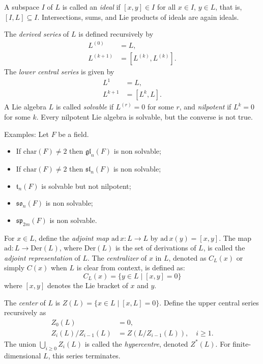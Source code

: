 \documentclass[11pt]{amsart}
\theoremstyle{plain}
\def\ad{\mathrm{ad}}
\def\der{\mathrm{Der}}
\def\ch{\mathrm{char}}
\begin{document}
A subspace $I$ of $L$ is called an \emph{ideal} if $[x,y] \in I$ for all $x \in I$, $y \in L$, that is, $[I,L] \subseteq I$. Intersections, sums, and Lie products of ideals are again ideals.

The \emph{derived series} of $L$ is defined recursively by
\begin{align*}
    L^{(0)} &= L, \\
    L^{(k+1)} &= [L^{(k)}, L^{(k)}].
\end{align*}
The \emph{lower central series} is given by
\begin{align*}
    L^1 &= L, \\
    L^{k+1} &= [L^k, L].
\end{align*}
A Lie algebra $L$ is called \emph{solvable} if $L^{(r)} = 0$ for some $r$, and \emph{nilpotent} if $L^k = 0$ for some $k$. Every nilpotent Lie algebra is solvable, but the converse is not true.

Examples: Let $F$ be a field.
\begin{itemize}
    \item If $\ch(F) \neq 2$ then $\mathfrak{gl}_n(F)$  is non solvable;
    \item If $\ch(F) \neq 2$ then $\mathfrak{sl}_n(F)$ is non solvable;
    \item $\mathfrak{t}_n(F)$ is solvable but not nilpotent;
   \item $\mathfrak{so}_n(F)$ is non solvable;
    \item $\mathfrak{sp}_{2m}(F)$ is non solvable.
\end{itemize}

For $x \in L$, define the \emph{adjoint map} $\ad\, x : L \to L$ by $\ad\, x(y) = [x,y]$. The map $\ad: L \longrightarrow \der(L)$, where $\der(L)$ is the set of derivations of $L$, is called the \emph{adjoint representation} of $L$. The \emph{centralizer} of $x$ in $L$, denoted as $C_L(x)$ or simply $C(x)$ when $L$ is clear from context, is defined as: 
\[C_L(x) = \{y\in L\mid [x,y] = 0 \}\] 
where $[x,y]$ denotes the Lie bracket of $x$ and $y$.



The \emph{center} of $L$ is $Z(L) = \{x \in L \mid [x,L] = 0\}$. Define the upper central series recursively as
\begin{align*}
    Z_0(L) &= 0, \\
    Z_i(L)/Z_{i-1}(L) &= Z(L/Z_{i-1}(L)), \quad i \geq 1.
\end{align*}
The union $\bigcup_{i \geq 0} Z_i(L)$ is called the \emph{hypercentre}, denoted $Z^*(L)$. For finite-dimensional $L$, this series terminates.
\end{document}
